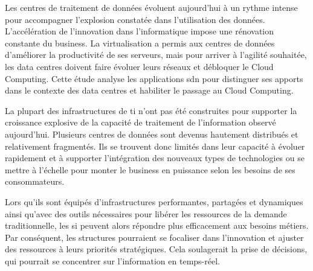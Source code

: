 


Les centres de traitement de données évoluent aujourd'hui à un rythme intense pour accompagner l'explosion constatée dans l'utilisation des données. L'accélération de l'innovation dans l'informatique impose une rénovation constante du business. La virtualisation a permis aux centres de données d'améliorer la productivité de ses serveurs, mais pour arriver à l'agilité souhaitée, les data centres doivent faire évoluer leurs réseaux et débloquer le Cloud Computing. Cette étude analyse les applications \gls{sdn} pour distinguer ses apports dans le contexte des data centres et habiliter le passage au Cloud Computing.

\par 
La plupart des infrastructures de \gls{ti} n'ont pas été construites pour supporter la croissance explosive de la capacité de traitement de l'information observé aujourd'hui. Plusieurs centres de données sont devenus hautement distribués et relativement fragmentés. Ils se trouvent donc limités dans leur capacité à évoluer rapidement et à supporter l'intégration des nouveaux types de technologies ou se mettre à l'échelle pour monter le business en puissance selon les besoins de ses consommateurs.

\par 
Lors qu'ils sont équipés d'infrastructures performantes, partagées et dynamiques ainsi qu'avec des outils nécessaires pour libérer les ressources de la demande traditionnelle, les \gls{si} peuvent alors répondre plus efficacement aux besoins métiers. Par conséquent, les structures pourraient se focaliser dans l'innovation et ajuster des ressources à leurs priorités stratégiques. Cela soulagerait la prise de décisions, qui pourrait se concentrer sur l'information en temps-réel.

